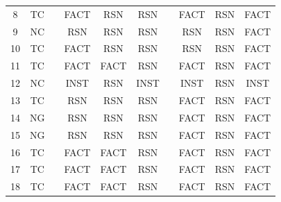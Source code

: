 \begin{table}[h]
{\begin{tabular}{cccccccccc@{}}
8 & {\color[HTML]{EA4335} TC} &  & {\color[HTML]{EA4335} FACT} & {\color[HTML]{4285F4} RSN} & {\color[HTML]{4285F4} RSN} &  & {\color[HTML]{EA4335} FACT} & {\color[HTML]{4285F4} RSN} & {\color[HTML]{EA4335} FACT} \\
9 & {\color[HTML]{34A853} NC} &  & {\color[HTML]{4285F4} RSN} & {\color[HTML]{4285F4} RSN} & {\color[HTML]{4285F4} RSN} &  & {\color[HTML]{4285F4} RSN} & {\color[HTML]{4285F4} RSN} & {\color[HTML]{EA4335} FACT} \\
10 & {\color[HTML]{EA4335} TC} &  & {\color[HTML]{EA4335} FACT} & {\color[HTML]{4285F4} RSN} & {\color[HTML]{4285F4} RSN} &  & {\color[HTML]{4285F4} RSN} & {\color[HTML]{4285F4} RSN} & {\color[HTML]{EA4335} FACT} \\
11 & {\color[HTML]{EA4335} TC} &  & {\color[HTML]{EA4335} FACT} & {\color[HTML]{EA4335} FACT} & {\color[HTML]{4285F4} RSN} &  & {\color[HTML]{EA4335} FACT} & {\color[HTML]{4285F4} RSN} & {\color[HTML]{EA4335} FACT} \\
12 & {\color[HTML]{34A853} NC} &  & INST & {\color[HTML]{4285F4} RSN} & INST &  & INST & {\color[HTML]{4285F4} RSN} & INST \\
13 & {\color[HTML]{EA4335} TC} &  & {\color[HTML]{4285F4} RSN} & {\color[HTML]{4285F4} RSN} & {\color[HTML]{4285F4} RSN} &  & {\color[HTML]{EA4335} FACT} & {\color[HTML]{4285F4} RSN} & {\color[HTML]{EA4335} FACT} \\
14 & {\color[HTML]{4285F4} NG} &  & {\color[HTML]{4285F4} RSN} & {\color[HTML]{4285F4} RSN} & {\color[HTML]{4285F4} RSN} &  & {\color[HTML]{EA4335} FACT} & {\color[HTML]{4285F4} RSN} & {\color[HTML]{EA4335} FACT} \\
15 & {\color[HTML]{4285F4} NG} &  & {\color[HTML]{4285F4} RSN} & {\color[HTML]{4285F4} RSN} & {\color[HTML]{4285F4} RSN} &  & {\color[HTML]{EA4335} FACT} & {\color[HTML]{4285F4} RSN} & {\color[HTML]{EA4335} FACT} \\
16 & {\color[HTML]{EA4335} TC} &  & {\color[HTML]{EA4335} FACT} & {\color[HTML]{EA4335} FACT} & {\color[HTML]{4285F4} RSN} &  & {\color[HTML]{EA4335} FACT} & {\color[HTML]{4285F4} RSN} & {\color[HTML]{EA4335} FACT} \\
17 & {\color[HTML]{EA4335} TC} &  & {\color[HTML]{EA4335} FACT} & {\color[HTML]{EA4335} FACT} & {\color[HTML]{4285F4} RSN} &  & {\color[HTML]{EA4335} FACT} & {\color[HTML]{4285F4} RSN} & {\color[HTML]{EA4335} FACT} \\
18 & {\color[HTML]{EA4335} TC} &  & {\color[HTML]{EA4335} FACT} & {\color[HTML]{EA4335} FACT} & {\color[HTML]{4285F4} RSN} &  & {\color[HTML]{EA4335} FACT} & {\color[HTML]{4285F4} RSN} & {\color[HTML]{EA4335} FACT} \\

\end{tabular}}
\end{table}
